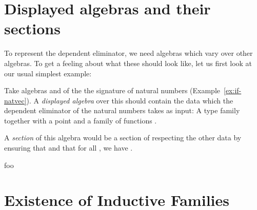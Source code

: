 \section{Displayed algebras and their sections}

To represent the dependent eliminator, we need algebras which vary over other
algebras.
To get a feeling about what these should look like, let us first look at our
usual simplest example:

\begin{example}\label{ex:if-d-nat}
Take algebras  and
 of
the the signature of natural numbers (Example~\ref{ex:if-natvec}).
A \emph{displayed algebra} over this should contain the data which the dependent
eliminator of the natural numbers takes as input:
A type family  together with a point 
and a family of functions .

A \emph{section} of this algebra would be a section  of
 respecting the other data by ensuring that 
and that for all , we have .
\end{example}

foo

\section{Existence of Inductive Families}







